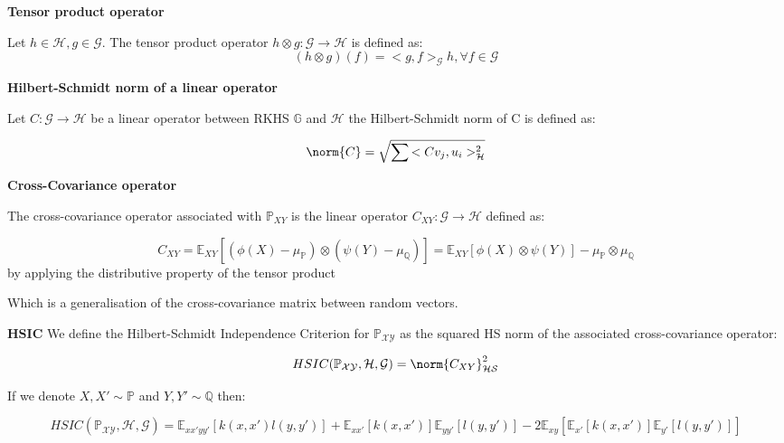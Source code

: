 \begin{defn}
\textsf{\textbf{Tensor product operator}}

Let $h \in \mathcal{H},g \in \mathcal{G}$. The tensor product operator $h \otimes g: \mathcal{G}\rightarrow\mathcal{H}$ is defined as:
\vspace{5mm}
$$(h \otimes g)(f) = <g,f>_{\mathcal{G}}h, \forall f \in \mathcal{G}$$
\end{defn}
\begin{defn}
\textsf{\textbf{Hilbert-Schmidt norm of a linear operator}}

Let $C:\mathcal{G}\rightarrow\mathcal{H}$ be a linear operator between RKHS $\mathbb{G} $ and $\mathcal{H}$ the Hilbert-Schmidt norm of C is defined as:

\vspace{5mm}
$$\norm{C} = \sqrt{\sum{<Cv_{j},u_{i}>^{2}_{\mathcal{H}}}}$$
\end{defn}
\begin{defn}
\textsf{\textbf{Cross-Covariance operator}}

The cross-covariance operator associated with $\mathbb{P}_{XY}$ is the linear operator $C_{XY}:\mathcal{G}\rightarrow\mathcal{H}$ defined as:

\vspace{5mm}
$$C_{XY} = \mathbb{E}_{XY}[(\phi(X)-\mu_{\mathbb{P}}) \otimes (\psi(Y) -\mu_{\mathbb{Q}})] = \mathbb{E}_{XY}[\phi(X) \otimes \psi(Y)] - \mu_{\mathbb{P}} \otimes \mu_{\mathbb{Q}} $$
by applying the distributive property of the tensor product

Which is a generalisation of the cross-covariance matrix between random vectors.
\end{defn}
\begin{defn}
\textsf{\textbf{HSIC}}
We define the Hilbert-Schmidt Independence Criterion for $\mathbb{P}_{\mathcal{X}\mathcal{Y}}$ as the squared HS norm of the associated cross-covariance operator:

\vspace{5mm}
$$HSIC(\mathbb{P}_{\mathcal{X}\mathcal{Y}},\mathcal{H},\mathcal{G}) = \norm{C_{XY}}^{2}_{\mathcal{HS}}$$
\end{defn}
\begin{lem}

If we denote $X,X'\sim \mathbb{P}$ and $Y,Y'\sim \mathbb{Q}$ then:

$$HSIC(\mathbb{P}_{\mathcal{X}\mathcal{Y}},\mathcal{H},\mathcal{G}) = \mathbb{E}_{xx'yy'}[k(x,x')l(y,y')] + \mathbb{E}_{xx'}[k(x,x')]\mathbb{E}_{yy'}[l(y,y')] -2\mathbb{E}_{xy}[\mathbb{E}_{x'}[k(x,x')]\mathbb{E}_{y'}[l(y,y')]]$$

\end{lem}

